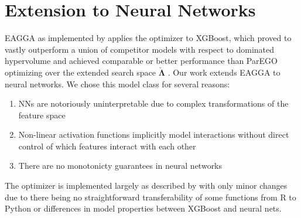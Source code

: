 \documentclass[twoside,11pt]{article}
\begin{document}
\section{Extension to Neural Networks}
EAGGA as implemented by \citet{EAGGA} applies the optimizer to XGBoost, which proved to vastly outperform a union of competitor models with respect to
dominated hypervolume and achieved comparable or better performance than ParEGO optimizing over the
extended search space $\check{\boldsymbol\Lambda}$ \citep[pp. 543-545]{EAGGA}.
Our work extends EAGGA to neural networks. We chose this model class for several reasons:
\begin{enumerate}[label*=\arabic*.]
  \item NNs are notoriously uninterpretable due to complex transformations of the feature space
  \item Non-linear activation functions implicitly model interactions without direct control of which features interact with each other
  \item There are no monotonicty guarantees in neural networks
\end{enumerate}
The optimizer is implemented largely as described by \citet{EAGGA} with only minor changes due to there being no straightforward transferability of some functions
from R to Python or differences in model properties between XGBoost and neural nets.\\
\end{document}
